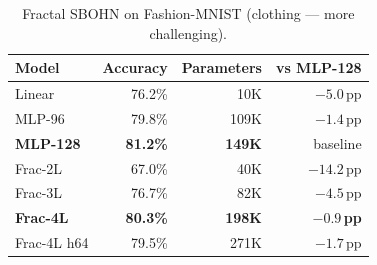 \begin{table}[h]
\centering
\caption{Fractal SBOHN on Fashion-MNIST (clothing --- more challenging).}
\begin{tabular}{l r r r}
\hline
Model & Accuracy & Parameters & vs MLP-128 \\
\hline
Linear & 76.2\% & 10K & $-5.0$\,pp \\
MLP-96 & 79.8\% & 109K & $-1.4$\,pp \\
\textbf{MLP-128} & \textbf{81.2\%} & \textbf{149K} & baseline \\
Frac-2L & 67.0\% & 40K & $-14.2$\,pp \\
Frac-3L & 76.7\% & 82K & $-4.5$\,pp \\
\textbf{Frac-4L} & \textbf{80.3\%} & \textbf{198K} & $\mathbf{-0.9}$\,\textbf{pp} \\
Frac-4L h64 & 79.5\% & 271K & $-1.7$\,pp \\
\hline
\end{tabular}
\end{table}
